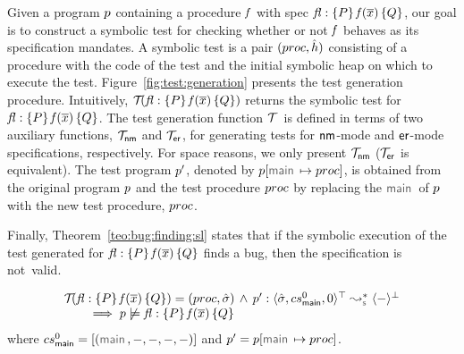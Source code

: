 Given a \jsil program $p$ containing a procedure $\mathit{f}$ with spec {\small ${\mathit{fl}} : \{ P \} \, \mathit{f}(\overline{x}) \, \{ Q \}$}, 
our goal is to construct a symbolic test for checking whether or not $\mathit{f}$ behaves as its specification mandates.
A symbolic test is a pair $(proc, \hat{h})$ consisting of a \jsil procedure with the code of the test and the initial 
symbolic heap on which to execute the test. 
%
Figure~\ref{fig:test:generation} presents the test generation procedure. Intuitively, $\mathcal{T}_{}({\mathit{fl}} : \{ P \} \, \mathit{f}(\overline{x}) \, \{ Q \})$ 
returns the symbolic test for ${\mathit{fl}} : \{ P \} \, \mathit{f}(\overline{x}) \, \{ Q \}$. The test generation function $\testifyfun{} \ $ is defined in terms 
of two auxiliary functions, $\mathcal{T}_{{\sf nm}}$ and $\mathcal{T}_{{\sf er}}$, for generating tests for ${\sf nm}$-mode and 
${\sf er}$-mode specifications, respectively. 
For space reasons, we only present $\mathcal{T}_{{\sf nm}}$ ($\mathcal{T}_{{\sf er}}$ is equivalent). 
The test program $p'$, denoted by $\prog[\jsilmain \mapsto \proc]$, is obtained from the original program $p$ and the test procedure $proc$ by replacing the 
$\jsilmain$ of $p$ with the new test procedure, $proc$. 

Finally, Theorem~\ref{teo:bug:finding:sl} states that if the symbolic execution of the 
test generated for ${\mathit{fl}} : \{ P \} \, \mathit{f}(\overline{x}) \, \{ Q \}$ finds a bug, then the specification 
is not~valid.

\begin{theorem}\label{teo:bug:finding:sl}
$$
\begin{array}{l}
\testify{}(\specsig{\pass}{\pid(\jvec{x})}{\qass}{\flag})  = (\proc, \sstate) \, \wedge \, 
  \prog' :  \transabssemrule{\sstate, \csmain, 0}{-}{\top}{\bot}{\symbolic} \\ \quad \quad 
    \implies  
         \prog \not\satisfies \specsig{\pass}{\pid(\jvec{x})}{\qass}{\flag}
\end{array}
$$
\noindent where  $\csmain = [ (\jsilmain, -, -, -, -) ]$ 
and $\prog' = \prog[\jsilmain \mapsto \proc]$.
\end{theorem}



